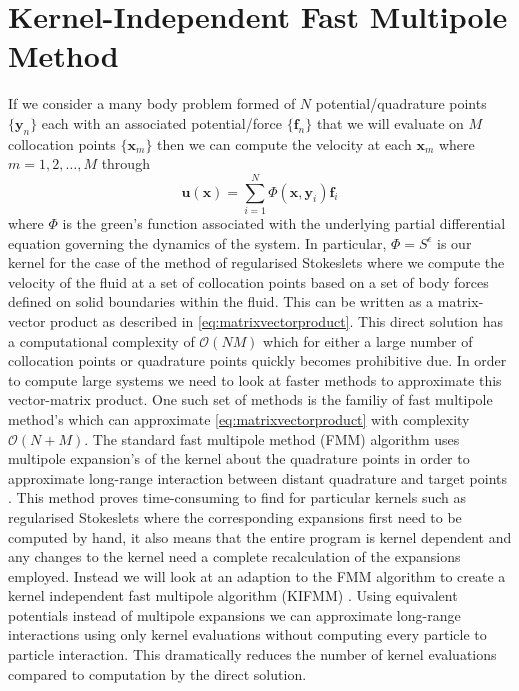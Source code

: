 \section{Kernel-Independent Fast Multipole Method}
If we consider a many body problem formed of $N$ potential/quadrature points $\{{\bm{y}}_n\}$ each with an associated potential/force $\{{\bm{f}}_n\}$ that we will evaluate on $M$ collocation points $\{\bm{x}_m\}$ then we can compute the velocity at each $\bm{x}_m$ where $m=1,2,\dots,M$ through
\begin{equation*}
    \bm{u}(\bm{x}) = \sum_{i=1}^N \Phi(\bm{x},{\bm{y}}_i){\bm{f}}_i
\end{equation*}
where $\Phi$ is the green's function associated with the underlying partial differential equation governing the dynamics of the system. In particular, $\Phi=S^\epsilon$ is our kernel for the case of the method of regularised Stokeslets where we compute the velocity of the fluid at a set of collocation points based on a set of body forces defined on solid boundaries within the fluid. This can be written as a matrix-vector product as described in \cref{eq:matrixvectorproduct}. This direct solution has a computational complexity of $\mathcal{O}(NM)$ which for either a large number of collocation points or quadrature points quickly becomes prohibitive due. In order to compute large systems we need to look at faster methods to approximate this vector-matrix product. One such set of methods is the familiy of fast multipole method's which can approximate \cref{eq:matrixvectorproduct} with complexity $\mathcal{O}(N+M)$. The standard fast multipole method (FMM) algorithm uses multipole expansion's of the kernel about the quadrature points in order to approximate long-range interaction between distant quadrature and target points \cite{Beatson,Tornberg2008,Wang2007AEquations,Yokota}. This method proves time-consuming to find for particular kernels such as regularised Stokeslets where the corresponding expansions first need to be computed by hand, it also means that the entire program is kernel dependent and any changes to the kernel need a complete recalculation of the expansions employed.
Instead we will look at an adaption to the FMM algorithm to create a kernel independent fast multipole algorithm (KIFMM) \cite{Ying2004, Ying2005,Rostami2016Kernel-independentStokeslets,Yan}. Using equivalent potentials instead of multipole expansions we can approximate long-range interactions using only kernel evaluations without computing every particle to particle interaction. This dramatically reduces the number of kernel evaluations compared to computation by the direct solution. 

